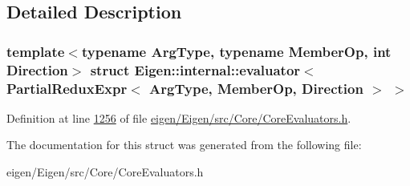\subsection{Detailed Description}
\subsubsection*{template$<$typename Arg\+Type, typename Member\+Op, int Direction$>$\newline
struct Eigen\+::internal\+::evaluator$<$ Partial\+Redux\+Expr$<$ Arg\+Type, Member\+Op, Direction $>$ $>$}



Definition at line \hyperlink{eigen_2_eigen_2src_2_core_2_core_evaluators_8h_source_l01256}{1256} of file \hyperlink{eigen_2_eigen_2src_2_core_2_core_evaluators_8h_source}{eigen/\+Eigen/src/\+Core/\+Core\+Evaluators.\+h}.



The documentation for this struct was generated from the following file\+:\begin{DoxyCompactItemize}
\item 
eigen/\+Eigen/src/\+Core/\+Core\+Evaluators.\+h\end{DoxyCompactItemize}

